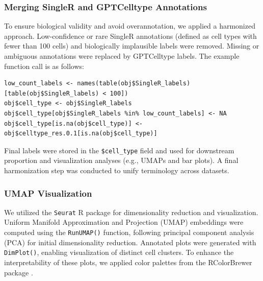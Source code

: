 \documentclass[
  12pt]{article}
\begin{document}
\subsubsection*{Merging SingleR and GPTCelltype Annotations}

To ensure biological validity and avoid overannotation, we applied a harmonized approach. Low-confidence or rare SingleR annotations (defined as cell types with fewer than 100 cells) and biologically implausible labels were removed. Missing or ambiguous annotations were replaced by GPTCelltype labels. The example function call is as follows:

{\small
\begin{verbatim}
low_count_labels <- names(table(obj$SingleR_labels)[table(obj$SingleR_labels) < 100])
obj$cell_type <- obj$SingleR_labels
obj$cell_type[obj$SingleR_labels %in% low_count_labels] <- NA
obj$cell_type[is.na(obj$cell_type)] <-obj$celltype_res.0.1[is.na(obj$cell_type)]
\end{verbatim}
}
Final labels were stored in the \texttt{\$cell\_type} field and used for downstream proportion and visualization analyses (e.g., UMAPs and bar plots). A final harmonization step was conducted to unify terminology across datasets.

\subsubsection*{UMAP Visualization}

We utilized the \texttt{Seurat} R package \cite{hao2023dictionary} for dimensionality reduction and visualization. Uniform Manifold Approximation and Projection (UMAP) embeddings were computed using the \texttt{RunUMAP()} function, following principal component analysis (PCA) for initial dimensionality reduction. Annotated plots were generated with \texttt{DimPlot()}, enabling visualization of distinct cell clusters. To enhance the interpretability of these plots, we applied color palettes from the RColorBrewer package \cite{RColorBrewer}.

\bigskip


%

\end{document}
